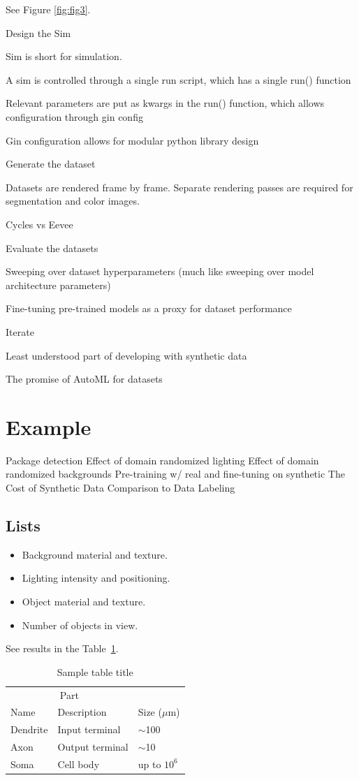 \documentclass{article}
\begin{document}
See Figure \ref{fig:fig3}.

Design the Sim

Sim is short for simulation.

A sim is controlled through a single run script, which has a single run() function

Relevant parameters are put as kwargs in the run() function, which allows configuration through gin config

Gin configuration allows for modular python library design

Generate the dataset

Datasets are rendered frame by frame. Separate rendering passes are required for segmentation and color images.

Cycles vs Eevee

Evaluate the datasets

Sweeping over dataset hyperparameters (much like sweeping over model architecture parameters)

Fine-tuning pre-trained models as a proxy for dataset performance

Iterate

Least understood part of developing with synthetic data

The promise of AutoML for datasets


\section{Example}
\label{sec:example}

Package detection
Effect of domain randomized lighting
Effect of domain randomized backgrounds
Pre-training w/ real and fine-tuning on synthetic
The Cost of Synthetic Data
Comparison to Data Labeling

\subsection{Lists}
\begin{itemize}
	\item Background material and texture.
	\item Lighting intensity and positioning.
	\item Object material and texture.
	\item Number of objects in view.
\end{itemize}

See results in the Table~\ref{tab:table}.

\begin{table}
	\caption{Sample table title}
	\centering
	\begin{tabular}{lll}
		\toprule
		\multicolumn{2}{c}{Part}                   \\
		\cmidrule(r){1-2}
		Name     & Description     & Size ($\mu$m) \\
		\midrule
		Dendrite & Input terminal  & $\sim$100     \\
		Axon     & Output terminal & $\sim$10      \\
		Soma     & Cell body       & up to $10^6$  \\
		\bottomrule
	\end{tabular}
	\label{tab:table}
\end{table}
\end{document}
